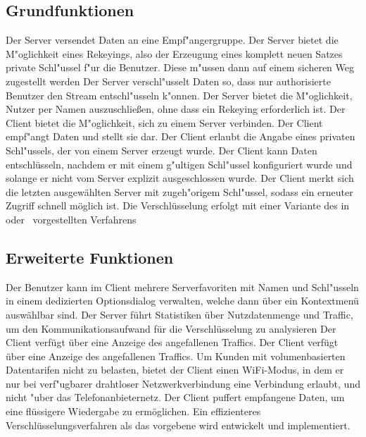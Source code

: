 \documentclass[a4paper,10pt]{scrartcl}
\begin{document}
\subsection{Grundfunktionen}

\begin{usecase}
 {Der Server versendet Daten an eine Empf"angergruppe.}
 {Der Server bietet die M"oglichkeit eines Rekeyings, also
                 der Erzeugung eines komplett neuen Satzes private Schl"ussel
                 f"ur die Benutzer. Diese m"ussen dann auf einem sicheren
                 Weg zugestellt werden}
 {Der Server verschl"usselt Daten so, dass nur authorisierte
                 Benutzer den Stream entschl"usseln k"onnen.}
 {Der Server bietet die M"oglichkeit, Nutzer per Namen auszuschließen,
                 ohne dass ein Rekeying erforderlich ist.}
 {Der Client bietet die M"oglichkeit, sich zu einem Server verbinden.}
 {Der Client empf"angt Daten und stellt sie dar.}
 {Der Client erlaubt die Angabe eines privaten Schl"ussels, der von
                 einem Server erzeugt wurde.}
 {Der Client kann Daten entschlüsseln, nachdem er mit einem
                 g"ultigen Schl"ussel konfiguriert wurde und solange er nicht
                 vom Server explizit ausgeschlossen wurde.}
 {Der Client merkt sich die letzten ausgewählten Server mit
                 zugeh"origem Schl"ussel, sodass ein erneuter Zugriff schnell möglich
                 ist.}
 {Die Verschlüsselung erfolgt mit einer Variante des in~\cite[Section 2.2]{Naor00}
                  oder~\cite{Garg10} vorgestellten Verfahrens}
\end{usecase}

\subsection{Erweiterte Funktionen}

\begin{usecase}
 {Der Benutzer kann im Client mehrere Serverfavoriten
                  mit Namen und Schl"usseln in einem dedizierten Optionsdialog verwalten,
                  welche dann über ein Kontextmenü auswählbar sind.}
 {Der Server führt Statistiken über Nutzdatenmenge und Traffic,
                  um den Kommunikationsaufwand für die Verschlüsselung zu
                  analysieren}
 {Der Client verfügt über eine Anzeige des angefallenen Traffics.}
 {Der Client verfügt über eine Anzeige des angefallenen Traffics.}
 {Um Kunden mit volumenbasierten Datentarifen nicht zu belasten,
                  bietet der Client einen WiFi-Modus, in dem er nur bei
                  verf"ugbarer drahtloser Netzwerkverbindung eine Verbindung erlaubt,
                  und nicht "uber das Telefonanbieternetz.}
 {Der Client puffert empfangene Daten, um eine flüssigere
                  Wiedergabe zu ermöglichen.}
 {Ein effizienteres Verschlüsselungsverfahren als das vorgebene
                  wird entwickelt und implementiert.}
\end{usecase}
\newpage
\end{document}
